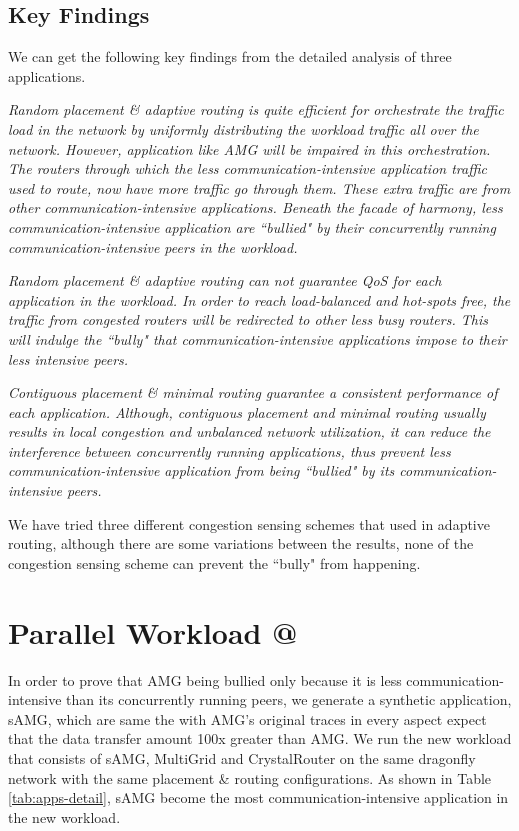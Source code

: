 \documentclass[conference,compsoc]{IEEEtran}
\makeatletter
\newcommand{\Rmnum}[1]{\expandafter\@slowromancap\romannumeral #1@}
\makeatother
\begin{document}
\subsection{Key Findings}
We can get the following key findings from the detailed analysis of three applications. 

\emph{Random placement \& adaptive routing is quite efficient for orchestrate the traffic load in the network by uniformly distributing the workload traffic all over the network. However, application like AMG will be impaired in this orchestration. The routers through which the less communication-intensive application traffic used to route, now have more traffic go through them. These extra traffic are from other communication-intensive applications. Beneath the facade of harmony, less communication-intensive application are ``bullied" by their concurrently running communication-intensive peers in the workload. }

\emph{Random placement \& adaptive routing can not guarantee QoS for each application in the workload. In order to reach load-balanced and hot-spots free, the traffic from congested routers will be redirected to other less busy routers. This will indulge the ``bully" that communication-intensive applications impose to their less intensive peers.}

\emph{Contiguous placement \& minimal routing guarantee a consistent performance of each application. Although, contiguous placement and minimal routing usually results in local congestion and unbalanced network utilization, it can reduce the interference between concurrently running applications, thus prevent less communication-intensive application from being ``bullied" by its communication-intensive peers.}

We have tried three different congestion sensing schemes that used in adaptive routing\cite{won-prog-adaptive}, although there are some variations between the results, none of the congestion sensing scheme can prevent the ``bully" from happening.

\section{Parallel Workload \Rmnum{2 }}
\label{sec:workload-2}


In order to prove that AMG being bullied only because it is less communication-intensive than its concurrently running peers, we generate a synthetic application, sAMG, which are same the with AMG's original traces in every aspect expect that the data transfer amount 100x greater than AMG. We run the new workload that consists of sAMG, MultiGrid and CrystalRouter on the same dragonfly network with the same placement \& routing configurations. As shown in Table \ref{tab:apps-detail}, sAMG become the most communication-intensive application in the new workload. 
\end{document}

